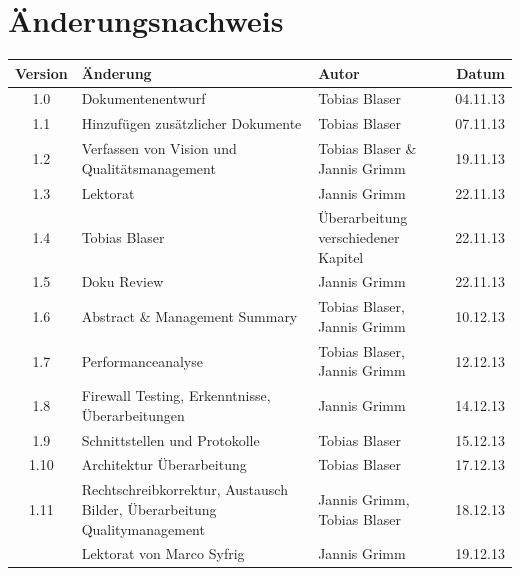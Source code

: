 




\chapter*{Änderungsnachweis}
\begin{tabularx}{\textwidth}{|cXlr|} %
		\hline
		\textbf{Version} & \textbf{Änderung} & \textbf{Autor} & \textbf{Datum}\\
		\hline
		1.0 & Dokumentenentwurf & Tobias Blaser & 04.11.13\\
		1.1 & Hinzufügen zusätzlicher Dokumente & Tobias Blaser & 07.11.13\\
		1.2 & Verfassen von Vision und Qualitätsmanagement & Tobias Blaser \& Jannis Grimm & 19.11.13\\
		1.3 & Lektorat & Jannis Grimm & 22.11.13\\
		1.4 & Tobias Blaser & Überarbeitung verschiedener Kapitel & 22.11.13\\
		1.5 & Doku Review & Jannis Grimm & 22.11.13\\
		1.6 & Abstract \& Management Summary & Tobias Blaser, Jannis Grimm & 10.12.13\\
		1.7 & Performanceanalyse & Tobias Blaser, Jannis Grimm & 12.12.13\\
		1.8 & Firewall Testing, Erkenntnisse, Überarbeitungen & Jannis
		Grimm & 14.12.13\\
		1.9 & Schnittstellen und Protokolle & Tobias Blaser & 15.12.13\\
		1.10 & Architektur Überarbeitung & Tobias Blaser & 17.12.13\\
		1.11 & Rechtschreibkorrektur, Austausch Bilder, Überarbeitung
		Qualitymanagement & Jannis Grimm, Tobias Blaser & 18.12.13\\
		\versionnumber & Lektorat von Marco Syfrig & Jannis Grimm & 19.12.13\\
		\hline
\end{tabularx}

\tableofcontents








